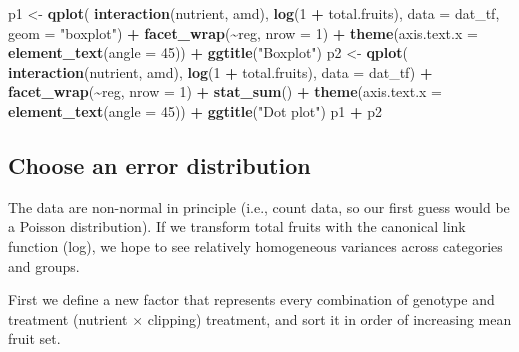 \documentclass[
  12pt,
]{book}
\newenvironment{Shaded}{\begin{snugshade}}{\end{snugshade}}
\newcommand{\DataTypeTok}[1]{\textcolor[rgb]{0.13,0.29,0.53}{#1}}
\newcommand{\DecValTok}[1]{\textcolor[rgb]{0.00,0.00,0.81}{#1}}
\newcommand{\KeywordTok}[1]{\textcolor[rgb]{0.13,0.29,0.53}{\textbf{#1}}}
\newcommand{\NormalTok}[1]{#1}
\newcommand{\OperatorTok}[1]{\textcolor[rgb]{0.81,0.36,0.00}{\textbf{#1}}}
\newcommand{\StringTok}[1]{\textcolor[rgb]{0.31,0.60,0.02}{#1}}
\begin{document}
\begin{Shaded}
\begin{Highlighting}[]
\NormalTok{p1 \textless{}{-}}\StringTok{ }\KeywordTok{qplot}\NormalTok{(}
    \KeywordTok{interaction}\NormalTok{(nutrient, amd),}
    \KeywordTok{log}\NormalTok{(}\DecValTok{1} \OperatorTok{+}\StringTok{ }\NormalTok{total.fruits),}
    \DataTypeTok{data =}\NormalTok{ dat\_tf, }\DataTypeTok{geom =} \StringTok{"boxplot"}\NormalTok{) }\OperatorTok{+}
\StringTok{  }\KeywordTok{facet\_wrap}\NormalTok{(}\OperatorTok{\textasciitilde{}}\NormalTok{reg, }\DataTypeTok{nrow =} \DecValTok{1}\NormalTok{) }\OperatorTok{+}
\StringTok{  }\KeywordTok{theme}\NormalTok{(}\DataTypeTok{axis.text.x =} \KeywordTok{element\_text}\NormalTok{(}\DataTypeTok{angle =} \DecValTok{45}\NormalTok{)) }\OperatorTok{+}
\StringTok{  }\KeywordTok{ggtitle}\NormalTok{(}\StringTok{"Boxplot"}\NormalTok{)}
\NormalTok{p2 \textless{}{-}}\StringTok{ }\KeywordTok{qplot}\NormalTok{(}
    \KeywordTok{interaction}\NormalTok{(nutrient, amd),}
    \KeywordTok{log}\NormalTok{(}\DecValTok{1} \OperatorTok{+}\StringTok{ }\NormalTok{total.fruits),}
    \DataTypeTok{data =}\NormalTok{ dat\_tf) }\OperatorTok{+}
\StringTok{  }\KeywordTok{facet\_wrap}\NormalTok{(}\OperatorTok{\textasciitilde{}}\NormalTok{reg, }\DataTypeTok{nrow =} \DecValTok{1}\NormalTok{) }\OperatorTok{+}
\StringTok{  }\KeywordTok{stat\_sum}\NormalTok{() }\OperatorTok{+}
\StringTok{  }\KeywordTok{theme}\NormalTok{(}\DataTypeTok{axis.text.x =} \KeywordTok{element\_text}\NormalTok{(}\DataTypeTok{angle =} \DecValTok{45}\NormalTok{)) }\OperatorTok{+}
\StringTok{  }\KeywordTok{ggtitle}\NormalTok{(}\StringTok{"Dot plot"}\NormalTok{)}
\NormalTok{p1 }\OperatorTok{+}\StringTok{ }\NormalTok{p2}
\end{Highlighting}
\end{Shaded}

\hypertarget{choose-an-error-distribution}{%
\subsection{Choose an error distribution}\label{choose-an-error-distribution}}

The data are non-normal in principle (i.e., count data, so our first guess would be a Poisson distribution). If we transform total fruits with the canonical link function (log), we hope to see relatively homogeneous variances across categories and groups.

First we define a new factor that represents every combination of genotype and treatment (nutrient × clipping) treatment, and sort it in order of increasing mean fruit set.
\end{document}
